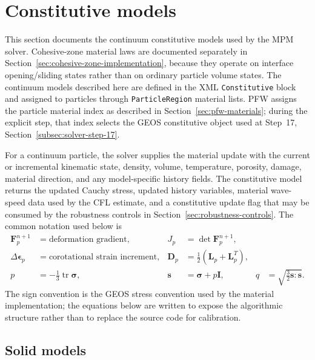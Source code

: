 \section{Constitutive models}
\label{sec:constitutive}

This section documents the continuum constitutive models used by the MPM solver.  Cohesive-zone material laws are documented separately in Section~\ref{sec:cohesive-zone-implementation}, because they operate on interface opening/sliding states rather than on ordinary particle volume states.  The continuum models described here are defined in the XML \texttt{Constitutive} block and assigned to particles through \texttt{ParticleRegion} material lists.  PFW assigns the particle material index as described in Section~\ref{sec:pfw-materials}; during the explicit step, that index selects the GEOS constitutive object used at Step~17, Section~\ref{subsec:solver-step-17}.

For a continuum particle, the solver supplies the material update with the current or incremental kinematic state, density, volume, temperature, porosity, damage, material direction, and any model-specific history fields.  The constitutive model returns the updated Cauchy stress, updated history variables, material wave-speed data used by the CFL estimate, and a constitutive update flag that may be consumed by the robustness controls in Section~\ref{sec:robustness-controls}.  The common notation used below is
\begin{align}
  \mathbf{F}_{p}^{n+1} &= \text{deformation gradient},
  & J_p &= \det \mathbf{F}_{p}^{n+1}, \\
  \Delta \boldsymbol{\epsilon}_p &= \text{corotational strain increment},
  & \mathbf{D}_p &= \frac{1}{2}\left(\mathbf{L}_p+\mathbf{L}_p^T\right), \\
  p &= -\frac{1}{3}\operatorname{tr}\boldsymbol{\sigma},
  & \mathbf{s} &= \boldsymbol{\sigma}+p\mathbf{I},
  & q &= \sqrt{\frac{3}{2}\mathbf{s}:\mathbf{s}} .
\end{align}
The sign convention is the GEOS stress convention used by the material implementation; the equations below are written to expose the algorithmic structure rather than to replace the source code for calibration.

\subsection{Solid models}
\label{subsec:solid-constitutive-models}

